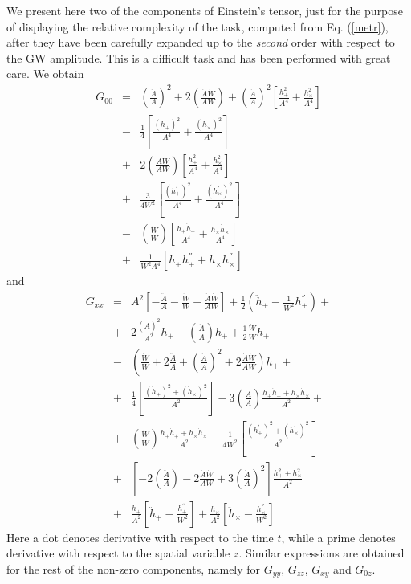 \documentclass[prd,twocolumn,showpacs,preprintnumbers,amsmath,amssy mb]{revtex4}
\newcommand{\bea}{\begin{eqnarray}}
\newcommand{\eea}{\end{eqnarray}}
\newcommand{\nn}{\nonumber}
\begin{document}
We present here two of the components of Einstein's tensor, 
just for the purpose of displaying the relative complexity 
of the task, computed from Eq. (\ref{metr}), after they have 
been carefully expanded up to the {\it second} order with respect to 
the GW amplitude.  This is a difficult task and has 
been performed with great care. We obtain 
\bea
\label{g00}
G_{00}
&=&\left(\frac{\dot{A}}{A}\right)^{2}+
2\left(\frac{\dot{A}\dot{W}}{AW}\right)+
\left(\frac{\dot{A}}{A}\right)^{2}
\left[\frac{h_{+}^{2}}{A^{4}}+\frac{h_{\times }^{2}}{A^{4}}\right]\nn \\
&-&\frac{1}{4}\left[\frac{(\dot{h_{+}})^{2}}{A^{4}}+\frac{(\dot{h_{\times }})^{2}}{A^{4}}\right]
\nn \\
&+&2\left(\frac{\dot{A}\dot{W}}{AW}\right)
\left[\frac{h_{+}^{2}}{A^{4}}+\frac{h_{\times }^{2}}{A^{4}}\right]\nn \\
&+&\frac{3}{4W^{2}}
\left[\frac{(h_{+}^{'})^{2}}{A^{4}}+\frac{(h_{\times }^{'})^{2}}{A^{4}}\right]
\nn \\&-&\left(\frac{\dot{W}}{W}\right)
\left[\frac{h_{+}\dot{h}_{+}}{A^{4}}+\frac{h_{\times }\dot{h}_{\times }}{A^{4}}\right]
\nn \\
&+&\frac{1}{W^{2}A^{4}}[h_{+}h_{+}^{''}+h_{\times }h_{\times }^{''}]
\eea
and
\bea 
\label{gxx}
G_{xx}&=&A^{2}
\left[-\frac{\ddot{A}}{A}-\frac{\ddot{W}}{W}-\frac{\dot{A}\dot{W}}{AW}\right]
+\frac{1}{2}\left(\ddot{h}_{+}-\frac{1}{W^{2}}h_{+}^{''}\right)+\nn \\
&+&2\frac{(\dot{A})^{2}}{A^{2}}h_{+}-\left(\frac{\dot{A}}{A}\right)\dot{h}_{+}
+\frac{1}{2}\frac{\dot{W}}{W}\dot{h}_{+}-\nn \\
&-&\left(\frac{\ddot{W}}{W}+2\frac{\ddot{A}}{A}+\left(\frac{\dot{A}}{A}\right)^{2}+\right.
\left.2\frac{\dot{A}\dot{W}}{AW}\right)h_{+}+\nn \\
&+&\frac{1}{4}\left[\frac{(\dot{h}_{+})^{2}+(\dot{h}_{\times })^{2}}{A^{2}}\right]
-3\left(\frac{\dot{A}}{A}\right)\frac{h_{+}\dot{h}_{+}+h_{\times }\dot{h}_{\times }}{A^{2}}
+\nn \\&+&
\left(\frac{\dot{W}}{W}\right)\frac{h_{+}\dot{h}_{+}+h_{\times }\dot{h}_{\times }}{A^{2}}-
\frac{1}{4W^{2}}
\left[\frac{(h_{+}^{'})^{2}+(h_{\times }^{'})^{2}}{A^{2}}\right]+\nn \\&+&
\left[-2\left(\frac{\ddot{A}}{A}\right)-2\frac{\dot{A}\dot{W}}{AW}+3\left(\frac{\dot{A}}{A}\right)^{2}\right]
\frac{h_{+}^{2}+h_{\times }^{2}}{A^{2}}\nn \\
&+&\frac{h_{+}}{A^{2}}\left[\ddot{h}_{+}-\frac{h_{+}^{''}}{W^{2}}\right]+
\frac{h_{\times }}{A^{2}}\left[\ddot{h}_{\times }-\frac{h_{\times }^{''}}{W^{2}}\right]
\eea
Here a dot denotes derivative with respect to the time $t$, 
while a prime denotes derivative with respect to the spatial variable 
$z$. Similar expressions are obtained for the rest of the 
non-zero components, namely for $G_{yy}$, $G_{zz}$, 
$G_{xy}$ and $G_{0z}$. 
\end{document}
